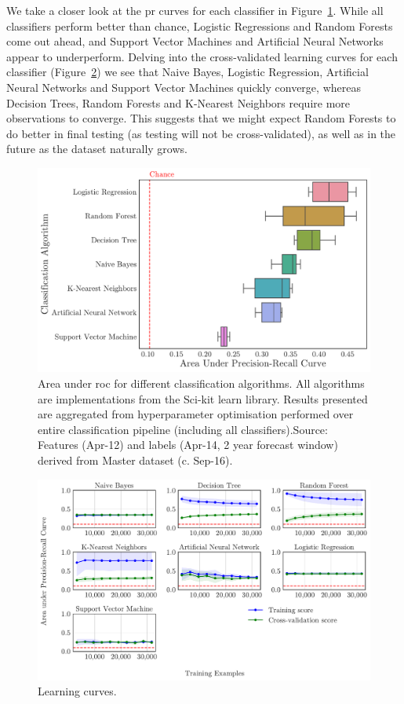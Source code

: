 \documentclass[../thesis/thesis.tex]{subfiles}
\begin{document}
We take a closer look at the \gls{pr} curves for each classifier in Figure~\ref{fig:design:classifier}. While all classifiers perform better than chance, Logistic Regressions and Random Forests come out ahead, and Support Vector Machines and Artificial Neural Networks appear to underperform. Delving into the cross-validated learning curves for each classifier (Figure~\ref{fig:design:create_learning_curves}) we see that Naive Bayes, Logistic Regression, Artificial Neural Networks and Support Vector Machines quickly converge, whereas Decision Trees, Random Forests and K-Nearest Neighbors require more observations to converge. This suggests that we might expect Random Forests to do better in final testing (as testing will not be cross-validated), as well as in the future as the dataset naturally grows.

\begin{figure}[!htb]
    \centering
    \includegraphics[width=\textwidth]{../figures/design/classifier}
    \caption[Area under PR Curves by classification algorithms]{Area under \gls{roc} for different classification algorithms. All algorithms are implementations from the Sci-kit learn library. Results presented are aggregated from hyperparameter optimisation performed over entire classification pipeline (including all classifiers).Source: Features (Apr-12) and labels (Apr-14, 2 year forecast window) derived from Master dataset (c. Sep-16).}
    \label{fig:design:classifier}
\end{figure}

\begin{figure}[!htb]
    \centering
    \includegraphics[width=\textwidth]{../figures/design/create_learning_curves}
    \caption[Learning curves by classification algorithms]{Learning curves.}
    \label{fig:design:create_learning_curves}
\end{figure}

\end{document}
